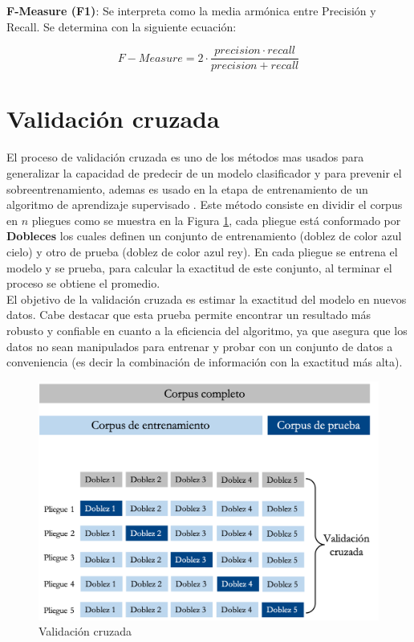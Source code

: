 \textbf{F-Measure (F1)}: Se interpreta como la media armónica entre Precisión y Recall. Se determina
con la siguiente ecuación:

\begin{equation}\label{eq:3}
	 F-Measure = 2 \cdot \frac{precision \cdot recall}{precision+recall}
\end{equation}


\section{Validación cruzada}

El proceso de validación cruzada es uno de los métodos mas usados para generalizar la capacidad de predecir de un modelo clasificador y para prevenir el sobre\-entrenamiento, ademas es usado en la etapa de entrenamiento de un algoritmo de aprendizaje supervisado \citep{CTValidacionC}. Este método consiste en dividir el corpus en $n$ pliegues como se muestra en la Figura \ref{cp3:diagramacv}, cada pliegue está conformado por \textbf{Dobleces} los cuales definen un conjunto de entrenamiento (doblez de color azul cielo) y otro de prueba (doblez de color azul rey). En cada pliegue se entrena el modelo y se prueba, para calcular la exactitud de este conjunto, al terminar el proceso se obtiene el promedio.\\

El objetivo de la validación cruzada es estimar la exactitud del modelo en nuevos datos. Cabe destacar que esta prueba permite encontrar un resultado más robusto y confiable en cuanto a la eficiencia del algoritmo, ya que asegura que los datos no sean manipulados para entrenar y probar con un conjunto de datos a conveniencia (es decir la combinación de información con la exactitud más alta).


\begin{figure}[h]
\centering
\includegraphics[scale=.75]{imagenes/Capitulo3/validacionc.png}
\caption{Validación cruzada}
\label{cp3:diagramacv}
\end{figure}

